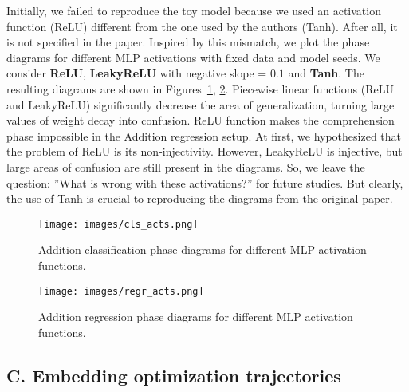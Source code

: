 Initially, we failed to reproduce the toy model because we used an activation function (ReLU) different from the one used by the authors (Tanh). After all, it is not specified in the paper. Inspired by this mismatch, we plot the phase diagrams for different MLP activations with fixed data and model seeds. We consider \textbf{ReLU}, \textbf{LeakyReLU} with negative slope = $0.1$ and \textbf{Tanh}. The resulting diagrams are shown in Figures~\ref{fig:cls-acts}, \ref{fig:regr-acts}. Piecewise linear functions (ReLU and LeakyReLU) significantly decrease the area of generalization, turning large values of weight decay into confusion. ReLU function makes the comprehension phase impossible in the Addition regression setup. At first, we hypothesized that the problem of ReLU is its non-injectivity. However, LeakyReLU is injective, but large areas of confusion are still present in the diagrams. So, we leave the question: ''What is wrong with these activations?'' for future studies. But clearly, the use of Tanh is crucial to reproducing the diagrams from the original paper.

\begin{figure}[H]
\caption{Addition classification phase diagrams for different MLP activation functions.}
\centering
\texttt{[image: images/cls\_acts.png]}
\label{fig:cls-acts}
\end{figure}

\begin{figure}[H]
\caption{Addition regression phase diagrams for different MLP activation functions.}
\centering
\texttt{[image: images/regr\_acts.png]}
\label{fig:regr-acts}
\end{figure}

\subsection*{C. Embedding optimization trajectories}
\label{app:C}

